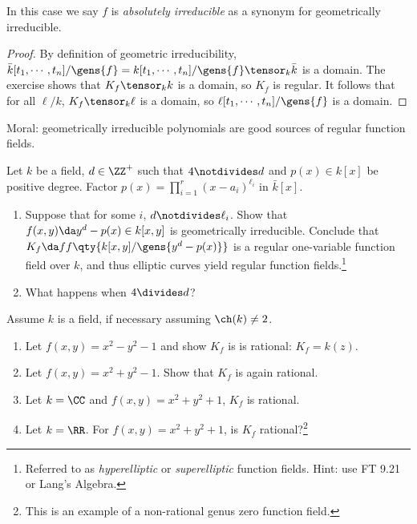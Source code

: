 In this case we say \(f\) is \emph{absolutely irreducible} as a synonym
for geometrically irreducible.

\begin{proof}

By definition of geometric irreducibility,
\(\bar k[t_1, \cdots, t_n]/\gens{f} = k[t_1, \cdots, t_n]/\gens{f} \tensor_k \bar k\)
is a domain. The exercise shows that \(K_f \tensor_k k\) is a domain, so
\(K_f\) is regular. It follows that for all \(\ell/k\),
\(K_f \tensor_k \ell\) is a domain, so
\(\ell[t_1, \cdots, t_n]/\gens{f}\) is a domain.

\end{proof}

Moral: geometrically irreducible polynomials are good sources of regular
function fields.

\begin{exercise}

Let \(k\) be a field, \(d\in \ZZ^+\) such that \(4\notdivides d\) and
\(p(x) \in k[x]\) be positive degree. Factor
\(p(x) = \prod_{i=1}^r (x-a_i)^{\ell_i}\) in \(\bar k[x]\).

\begin{enumerate}
\def\labelenumi{\alph{enumi}.}
\item
  Suppose that for some \(i\), \(d\notdivides \ell_i\). Show that
  \(f(x, y) \da y^d - p(x) \in k[x, y]\) is geometrically irreducible.
  Conclude that \(K_f \da ff\qty{k[x, y] / \gens{y^d - p(x)}}\) is a
  regular one-variable function field over \(k\), and thus elliptic
  curves yield regular function fields.\footnote{Referred to as
    \emph{hyperelliptic} or \emph{superelliptic} function fields. Hint:
    use FT 9.21 or Lang's Algebra.}
\item
  What happens when \(4\divides d\)?
\end{enumerate}

\end{exercise}

\begin{exercise}

Assume \(k\) is a field, if necessary assuming \(\ch(k) \neq 2\).

\begin{enumerate}
\def\labelenumi{\alph{enumi}.}
\item
  Let \(f(x, y) = x^2 - y^2 -1\) and show \(K_f\) is is rational:
  \(K_f = k(z)\).
\item
  Let \(f(x, y) = x^2 + y^2 - 1\). Show that \(K_f\) is again rational.
\item
  Let \(k = \CC\) and \(f(x, y) = x^2 + y^2 + 1\), \(K_f\) is rational.
\item
  Let \(k= \RR\). For \(f(x ,y) = x^2 + y^2 + 1\), is \(K_f\)
  rational?\footnote{This is an example of a non-rational genus zero
    function field.}
\end{enumerate}

\end{exercise}

